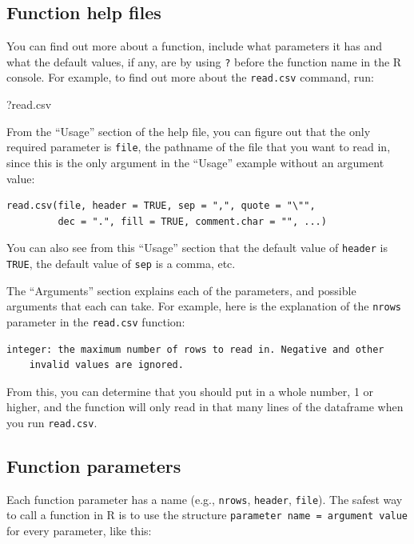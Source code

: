 \documentclass[]{book}
\makeatletter
\newenvironment{Shaded}{\begin{snugshade}}{\end{snugshade}}
\newcommand{\NormalTok}[1]{{#1}}
\newenvironment{kframe}{%
\medskip{}
\setlength{\fboxsep}{.8em}
 \def\at@end@of@kframe{}%
 \ifinner\ifhmode%
  \def\at@end@of@kframe{\end{minipage}}%
  \begin{minipage}{\columnwidth}%
 \fi\fi%
 \def\FrameCommand##1{\hskip\@totalleftmargin \hskip-\fboxsep
 \colorbox{shadecolor}{##1}\hskip-\fboxsep
     \hskip-\linewidth \hskip-\@totalleftmargin \hskip\columnwidth}%
 \MakeFramed {\advance\hsize-\width
   \@totalleftmargin\z@ \linewidth\hsize
   \@setminipage}}%
 {\par\unskip\endMakeFramed%
 \at@end@of@kframe}
\renewenvironment{Shaded}{\begin{kframe}}{\end{kframe}}
\makeatother
\begin{document}
\subsection{Function help files}\label{function-help-files}

You can find out more about a function, include what parameters it has
and what the default values, if any, are by using \texttt{?} before the
function name in the R console. For example, to find out more about the
\texttt{read.csv} command, run:

\begin{Shaded}
\begin{Highlighting}[]
\NormalTok{?read.csv}
\end{Highlighting}
\end{Shaded}

From the ``Usage'' section of the help file, you can figure out that the
only required parameter is \texttt{file}, the pathname of the file that
you want to read in, since this is the only argument in the ``Usage''
example without an argument value:

\begin{verbatim}
read.csv(file, header = TRUE, sep = ",", quote = "\"",
         dec = ".", fill = TRUE, comment.char = "", ...)
\end{verbatim}

You can also see from this ``Usage'' section that the default value of
\texttt{header} is \texttt{TRUE}, the default value of \texttt{sep} is a
comma, etc.

The ``Arguments'' section explains each of the parameters, and possible
arguments that each can take. For example, here is the explanation of
the \texttt{nrows} parameter in the \texttt{read.csv} function:

\begin{verbatim}
integer: the maximum number of rows to read in. Negative and other 
    invalid values are ignored.
\end{verbatim}

From this, you can determine that you should put in a whole number, 1 or
higher, and the function will only read in that many lines of the
dataframe when you run \texttt{read.csv}.

\subsection{Function parameters}\label{function-parameters}

Each function parameter has a name (e.g., \texttt{nrows},
\texttt{header}, \texttt{file}). The safest way to call a function in R
is to use the structure \texttt{parameter\ name\ =\ argument\ value} for
every parameter, like this:
\end{document}
